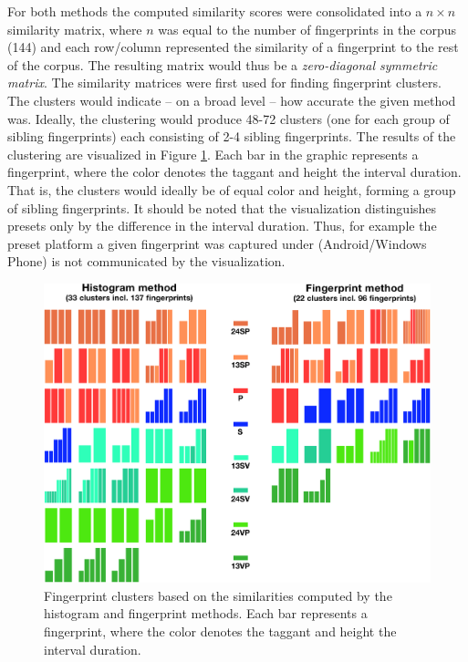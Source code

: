 \documentclass[thesis.tex]{subfiles}
\begin{document}
For both methods the computed similarity scores were consolidated into a $n\times n$ similarity matrix, where $n$ was equal to the number of fingerprints in the corpus (144) and each row/column represented the similarity of a fingerprint to the rest of the corpus. The resulting matrix would thus be a \emph{zero-diagonal symmetric matrix}. The similarity matrices were first used for finding fingerprint clusters. The clusters would indicate -- on a broad level -- how accurate the given method was. Ideally, the clustering would produce 48-72 clusters (one for each group of sibling fingerprints) each consisting of 2-4 sibling fingerprints. The results of the clustering are visualized in Figure \ref{figure:clusters}. Each bar in the graphic represents a fingerprint, where the color denotes the taggant and height the interval duration. That is, the clusters would ideally be of equal color and height, forming a group of sibling fingerprints. It should be noted that the visualization distinguishes presets only by the difference in the interval duration. Thus, for example the preset platform a given fingerprint was captured under (Android/Windows Phone) is not communicated by the visualization.

\begin{figure}[h]
\centering \includegraphics[page=1,width=\textwidth,height=\textheight,keepaspectratio=true]{images/experiment/clusters}
\caption{Fingerprint clusters based on the similarities computed by the histogram and fingerprint methods. Each bar represents a fingerprint, where the color denotes the taggant and height the interval duration.}
\label{figure:clusters}
\end{figure}
\end{document}
